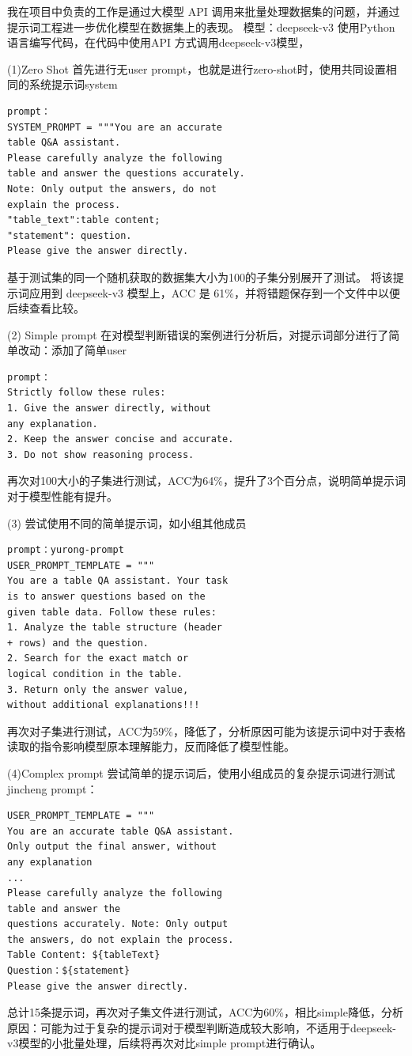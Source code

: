 \documentclass[10.5pt,compsoc]{CjC}
\theoremstyle{mystyle}
\begin{document}
\begin{CJK*}{UTF8}{song}
我在项目中负责的工作是通过大模型 API 调用来批量处理数据集的问题，并通过提示词工程进一步优化模型在数据集上的表现。
模型：deepseek-v3
使用Python语言编写代码，在代码中使用API 方式调用deepseek-v3模型，

(1)Zero Shot
首先进行无user prompt，也就是进行zero-shot时，使用共同设置相同的系统提示词system 
\begin{verbatim}
prompt：
SYSTEM_PROMPT = """You are an accurate 
table Q&A assistant. 
Please carefully analyze the following 
table and answer the questions accurately. 
Note: Only output the answers, do not 
explain the process.
"table_text":table content;
"statement": question.
Please give the answer directly.
\end{verbatim}
基于测试集的同一个随机获取的数据集大小为100的子集分别展开了测试。
将该提示词应用到 deepseek-v3 模型上，ACC 是 61\%，并将错题保存到一个文件中以便后续查看比较。

(2) Simple prompt
在对模型判断错误的案例进行分析后，对提示词部分进行了简单改动：添加了简单user 
\begin{verbatim}
prompt：
Strictly follow these rules:
1. Give the answer directly, without 
any explanation.
2. Keep the answer concise and accurate.
3. Do not show reasoning process.
\end{verbatim}
再次对100大小的子集进行测试，ACC为64\%，提升了3个百分点，说明简单提示词对于模型性能有提升。

(3) 尝试使用不同的简单提示词，如小组其他成员
\begin{verbatim}
prompt：yurong-prompt
USER_PROMPT_TEMPLATE = """
You are a table QA assistant. Your task 
is to answer questions based on the 
given table data. Follow these rules:
1. Analyze the table structure (header
+ rows) and the question.
2. Search for the exact match or 
logical condition in the table.
3. Return only the answer value, 
without additional explanations!!!
\end{verbatim}
再次对子集进行测试，ACC为59\%，降低了，分析原因可能为该提示词中对于表格读取的指令影响模型原本理解能力，反而降低了模型性能。

(4)Complex prompt
尝试简单的提示词后，使用小组成员的复杂提示词进行测试 jincheng prompt：
\begin{verbatim}
USER_PROMPT_TEMPLATE = """
You are an accurate table Q&A assistant.
Only output the final answer, without 
any explanation
...
Please carefully analyze the following 
table and answer the 
questions accurately. Note: Only output
the answers, do not explain the process.
Table Content: ${tableText}
Question：${statement}
Please give the answer directly.
\end{verbatim}
总计15条提示词，再次对子集文件进行测试，ACC为60\%，相比simple降低，分析原因：可能为过于复杂的提示词对于模型判断造成较大影响，不适用于deepseek-v3模型的小批量处理，后续将再次对比simple prompt进行确认。


\end{CJK*}
\end{document}
